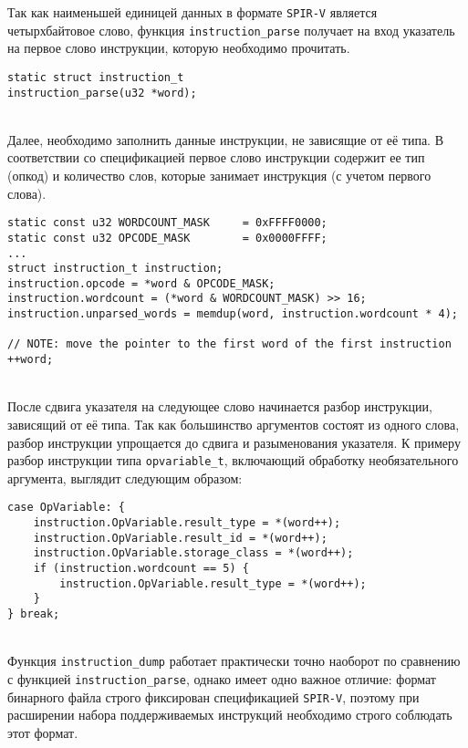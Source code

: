 \documentclass[14pt]{extarticle}
\begin{document}
Так как наименьшей единицей данных в формате \texttt{SPIR-V} является четырхбайтовое слово, функция \texttt{instruction\_parse} получает на вход указатель на первое слово инструкции, которую необходимо прочитать.
\begin{lstlisting}[caption={прототип функции разбора инструкции}]
static struct instruction_t
instruction_parse(u32 *word);
\end{lstlisting}
~\\ %

Далее, необходимо заполнить данные инструкции, не зависящие от её типа. В соответствии со спецификацией первое слово инструкции содержит ее тип (опкод) и количество слов, которые занимает инструкция (с учетом первого слова).
\begin{lstlisting}[caption={разбор общей части инструкции}]
static const u32 WORDCOUNT_MASK     = 0xFFFF0000;
static const u32 OPCODE_MASK        = 0x0000FFFF;
...
struct instruction_t instruction;
instruction.opcode = *word & OPCODE_MASK;
instruction.wordcount = (*word & WORDCOUNT_MASK) >> 16;
instruction.unparsed_words = memdup(word, instruction.wordcount * 4);

// NOTE: move the pointer to the first word of the first instruction
++word;
\end{lstlisting}
~\\ %

После сдвига указателя на следующее слово начинается разбор инструкции, зависящий от её типа. Так как большинство аргументов состоят из одного слова, разбор инструкции упрощается до сдвига и разыменования указателя. К примеру разбор инструкции типа \texttt{opvariable\_t}, включающий обработку необязательного аргумента, выглядит следующим образом:
\begin{lstlisting}[caption={пример разбора вариативной части инструкции}]
case OpVariable: {
    instruction.OpVariable.result_type = *(word++);
    instruction.OpVariable.result_id = *(word++);
    instruction.OpVariable.storage_class = *(word++);
    if (instruction.wordcount == 5) {
        instruction.OpVariable.result_type = *(word++);
    }
} break;
\end{lstlisting}
~\\ %

Функция \texttt{instruction\_dump} работает практически точно наоборот по сравнению с функцией \texttt{instruction\_parse}, однако имеет одно важное отличие: формат бинарного файла строго фиксирован спецификацией \texttt{SPIR-V}, поэтому при расширении набора поддерживаемых инструкций необходимо строго соблюдать этот формат.
\end{document}
